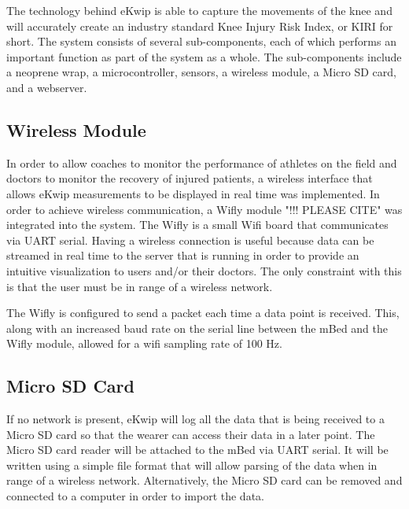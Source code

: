 The technology behind eKwip is able to capture the movements of the knee and will accurately create an industry standard Knee Injury Risk Index, or KIRI for short. The system consists of several sub-components, each of which performs an important function as part of the system as a whole. The sub-components include a neoprene wrap, a microcontroller, sensors, a wireless module, a Micro SD card, and a webserver.

\subsection {Wireless Module}
In order to allow coaches to monitor the performance of athletes on the field and doctors to monitor the recovery of injured patients, a wireless interface that allows eKwip measurements to be displayed in real time was implemented. In order to achieve wireless communication, a Wifly module "!!! PLEASE CITE" was integrated into the system. The Wifly is a small Wifi board that communicates via UART serial. Having a wireless connection is useful because data can be streamed in real time to the server that is running in order to provide an intuitive visualization to users and/or their doctors. The only constraint with this is that the user must be in range of a wireless network.

The Wifly is configured to send a packet each time a data point is received. This, along with an increased baud rate on the serial line between the mBed and the Wifly module, allowed for a wifi sampling rate of 100 Hz.

\subsection {Micro SD Card}
If no network is present, eKwip will log all the data that is being received to a Micro SD card so that the wearer can access their data in a later point. The Micro SD card reader will be attached to the mBed via UART serial. It will be written using a simple file format that will allow parsing of the data when in range of a wireless network. Alternatively, the Micro SD card can be removed and connected to a computer in order to import the data.

